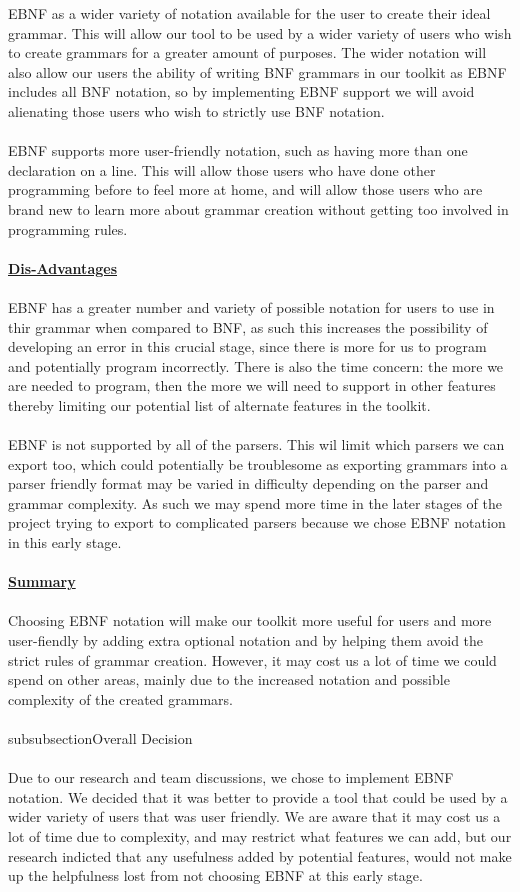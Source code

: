 \documentclass{l3proj}
\begin{document}
EBNF as a wider variety of notation available for the user to create their ideal grammar. This will allow our tool to be used by a wider variety of users who wish to create grammars for a greater amount of purposes. The wider notation will also allow our users the ability of writing BNF grammars in our toolkit as EBNF includes all BNF notation, so by implementing EBNF support we will avoid alienating those users who wish to strictly use BNF notation. \\
\\
EBNF supports more user-friendly notation, such as having more than one declaration on a line. This will allow those users who have done other programming before to feel more at home, and will allow those users who are brand new to learn more about grammar creation without getting too involved in programming rules.\\
\\
\textbf {\underline{Dis-Advantages}}\\
\\
EBNF has a greater number and variety of possible notation for users to use in thir grammar when compared to BNF, as such this increases the possibility of developing an error in this crucial stage, since there is more for us to program and potentially program incorrectly. There is also the time concern: the more we are needed to program, then the more we will need to support in other features thereby limiting our potential list of alternate features in the toolkit.\\
\\
EBNF is not supported by all of the parsers. This wil limit which parsers we can export too, which could potentially be troublesome as exporting grammars into a parser friendly format may be varied in difficulty depending on the parser and grammar complexity. As such we may spend more time in the later stages of the project trying to export to complicated parsers because we chose EBNF notation in this early stage.\\
\\
\textbf {\underline{Summary}}\\
\\
Choosing EBNF notation will make our toolkit more useful for users and more user-fiendly by adding extra optional notation and by helping them avoid the strict rules of grammar creation. However, it may cost us a lot of time we could spend on other areas, mainly due to the increased notation and possible complexity of the created grammars.\\
\\subsubsection{Overall Decision}\\
\\
Due to our research and team discussions, we chose to implement EBNF notation. We decided that it was better to provide a tool that could be used by a wider variety of users that was user friendly. We are aware that it may cost us a lot of time due to complexity, and may restrict what features we can add, but our research indicted that any usefulness added by potential features, would not make up the helpfulness lost from not choosing EBNF at this early stage. \\
\\
\end{document}
